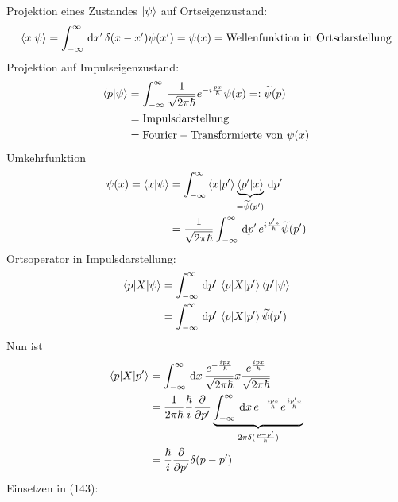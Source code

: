 \documentclass[a4paper]{scrartcl}
\begin{document}
{Projektion eines Zustandes $\ket \psi$ auf Ortseigenzustand:
\begin{align}
\braket{ x | \psi} = \int_{-\infty}^\infty \, \mathrm{d} x' \, \delta (x - x') \psi(x') = \psi(x) = \mathrm{ Wellenfunktion \ in \ Ortsdarstellung }
\end{align}
Projektion auf Impulseigenzustand:
\begin{align}
\begin{split}
\braket{ p | \psi} & = \int_{-\infty}^\infty \frac1{\sqrt{2\pi\hbar}} e^{-i \frac{px}\hbar} \psi(x) =: \widetilde \psi(p) \\
&  = \mathrm{Impulsdarstellung} \\
& = \mathrm{Fourier-Transformierte \ von \ } \psi(x)
\end{split}
\end{align}
Umkehrfunktion
\begin{align}
\begin{split}
\psi(x) = \braket{ x | \psi } & = \int_{-\infty}^\infty \braket{ x | p'} \underbrace{ \braket{ p' | x}}_{= \widetilde \psi(p')} \, \mathrm{d} p' \\
& = \frac1{\sqrt{2 \pi \hbar}} \int_{-\infty}^\infty \, \mathrm{d} p' \, e^{i \frac{p'x}\hbar} \widetilde \psi(p')
\end{split}
\end{align}
Ortsoperator in Impulsdarstellung:
\begin{align}
\begin{split}
\braket{ p | X | \psi} & = \int_{-\infty}^\infty \, \mathrm{d} p' \, \braket{ p | X | p'}\braket{p' | \psi} \\
& = \int_{-\infty}^\infty \, \mathrm{d} p' \, \braket{p | X | p'} \widetilde \psi(p')
\end{split}
\end{align}
Nun ist 
\begin{align}
\begin{split}
\braket{ p | X | p'} & = \int_{-\infty}^\infty \, \mathrm{d} x \, \frac{ e^{ - \frac{i p x}\hbar}}{\sqrt{2\pi \hbar}} x \frac{ e^{\frac{ipx}\hbar}}{\sqrt{2 \pi \hbar}} \\
& = \frac1{{2\pi\hbar}} \frac \hbar i \frac \partial {\partial p'} \underbrace{ \int_{-\infty}^\infty \, \mathrm{d} x \, e^{-\frac{ipx}\hbar} e^{\frac{ip'x}\hbar}}_{2 \pi \delta(\frac{p - p'}\hbar)} \\
& = \frac \hbar i \frac \partial {\partial p'} \delta(p - p')
\end{split}
\end{align}
Einsetzen in (143):
\begin{align}

\end{align}}
\end{document}
